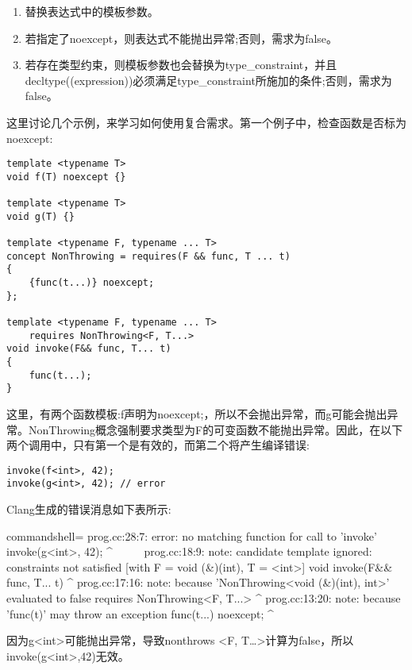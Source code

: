\begin{enumerate}
\item
替换表达式中的模板参数。

\item
若指定了noexcept，则表达式不能抛出异常;否则，需求为false。

\item
若存在类型约束，则模板参数也会替换为type\_constraint，并且decltype((expression))必须满足type\_constraint所施加的条件;否则，需求为false。
\end{enumerate}

这里讨论几个示例，来学习如何使用复合需求。第一个例子中，检查函数是否标为noexcept:

\begin{lstlisting}[style=styleCXX]
template <typename T>
void f(T) noexcept {}

template <typename T>
void g(T) {}

template <typename F, typename ... T>
concept NonThrowing = requires(F && func, T ... t)
{
	{func(t...)} noexcept;
};

template <typename F, typename ... T>
	requires NonThrowing<F, T...>
void invoke(F&& func, T... t)
{
	func(t...);
}
\end{lstlisting}

这里，有两个函数模板:f声明为noexcept;，所以不会抛出异常，而g可能会抛出异常。NonThrowing概念强制要求类型为F的可变函数不能抛出异常。因此，在以下两个调用中，只有第一个是有效的，而第二个将产生编译错误:

\begin{lstlisting}[style=styleCXX]
invoke(f<int>, 42);
invoke(g<int>, 42); // error
\end{lstlisting}

Clang生成的错误消息如下表所示:

\begin{tcblisting}{commandshell={}}
prog.cc:28:7: error: no matching function for call to 'invoke'
      invoke(g<int>, 42);
       ^~~~~~
prog.cc:18:9: note: candidate template ignored: constraints not
satisfied [with F = void (&)(int), T = <int>]
   void invoke(F&& func, T... t)
          ^
prog.cc:17:16: note: because 'NonThrowing<void (&)(int), int>'
evaluated to false
      requires NonThrowing<F, T...>
                  ^
prog.cc:13:20: note: because 'func(t)' may throw an exception
      {func(t...)} noexcept;
                       ^
\end{tcblisting}

因为g<int>可能抛出异常，导致nonthrows <F, T…>计算为false，所以invoke(g<int>,42)无效。

